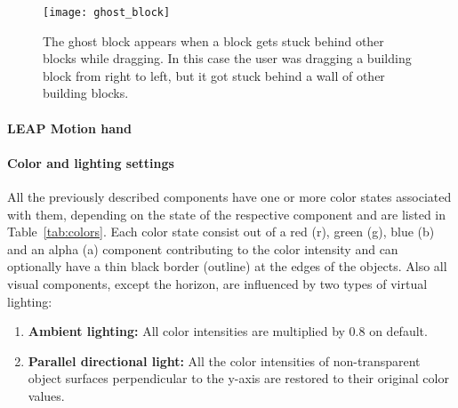 \begin{figure}[H]
\centering
\texttt{[image: ghost\_block]}
\caption{\label{fig:ghostblock} The ghost block appears when a block gets stuck behind other blocks while dragging. In this case the user was dragging a building block from right to left, but it got stuck behind a wall of other building blocks.}
\end{figure}


\paragraph{LEAP Motion hand}



\paragraph{Color and lighting settings}

All the previously described components have one or more color states associated with them, depending on the state of the respective component and are listed in Table~\ref{tab:colors}. Each  color state consist out of a red (r), green (g), blue (b) and an alpha (a) component contributing to the color intensity and can optionally have a thin black border (outline) at the edges of the objects. Also all visual components, except the horizon, are influenced by two types of virtual lighting: 
\begin{enumerate}
	\item{\textbf{Ambient lighting:}} All color intensities are multiplied by $0.8$ on default.
	\item{\textbf{Parallel directional light:}} All the color intensities of non-transparent object surfaces perpendicular to the y-axis are restored to their original color values.
\end{enumerate}


